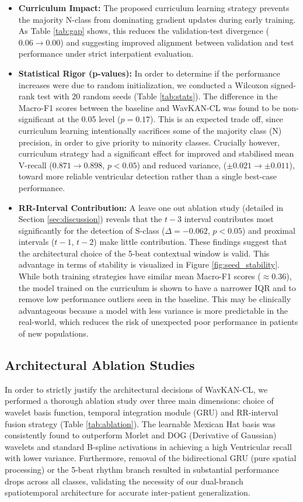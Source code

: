 \documentclass[pdflatex,sn-mathphys-num]{sn-jnl}
\theoremstyle{thmstyleone}
\theoremstyle{thmstyletwo}
\theoremstyle{thmstylethree}
\begin{document}
\begin{itemize}
    \item \textbf{Curriculum Impact:} The proposed curriculum learning strategy prevents the majority N-class from dominating gradient updates during early training. As Table \ref{tab:gap} shows, this reduces the validation-test divergence ($0.06 \to 0.00$) and suggesting improved alignment between validation and test performance under strict interpatient evaluation.
    \item \textbf{Statistical Rigor (p-values):} In order to determine if the performance increases were due to random initialization, we conducted a Wilcoxon signed-rank test with 20 random seeds (Table \ref{tab:stats}). The difference in the Macro-F1 scores between the baseline and WavKAN-CL was found to be non-significant at the 0.05 level ($p = 0.17$). This is an expected trade off, since curriculum learning intentionally sacrifices some of the majority class (N) precision, in order to give priority to minority classes. Crucially however, curriculum strategy had a significant effect for improved and stabilised mean V-recall ($0.871 \to 0.898$, $p < 0.05$) and reduced variance, ($\pm 0.021 \to \pm 0.011$), toward more reliable ventricular detection rather than a single best-case performance.
    \item \textbf{RR-Interval Contribution:} A leave one out ablation study (detailed in Section \ref{sec:discussion}) reveals that the $t - 3$ interval contributes most significantly for the detection of S-class ($\Delta = -0.062$, $p < 0.05$) and proximal intervals ($t - 1$, $t - 2$) make little contribution. These findings suggest that the architectural choice of the 5-beat contextual window is valid. This advantage in terms of stability is visualized in Figure \ref{fig:seed_stability}. While both training strategies have similar mean Macro-F1 scores ($\approx 0.36$), the model trained on the curriculum is shown to have a narrower IQR and to remove low performance outliers seen in the baseline. This may be clinically advantageous because a model with less variance is more predictable in the real-world, which reduces the risk of unexpected poor performance in patients of new populations.
\end{itemize}

\subsection{Architectural Ablation Studies}
In order to strictly justify the architectural decisions of WavKAN-CL, we performed a thorough ablation study over three main dimensions: choice of wavelet basis function, temporal integration module (GRU) and RR-interval fusion strategy (Table \ref{tab:ablation}). The learnable Mexican Hat basis was consistently found to outperform Morlet and DOG (Derivative of Gaussian) wavelets and standard B-spline activations in achieving a high Ventricular recall with lower variance. Furthermore, removal of the bidirectional GRU (pure spatial processing) or the 5-beat rhythm branch resulted in substantial performance drops across all classes, validating the necessity of our dual-branch spatiotemporal architecture for accurate inter-patient generalization.
\end{document}
